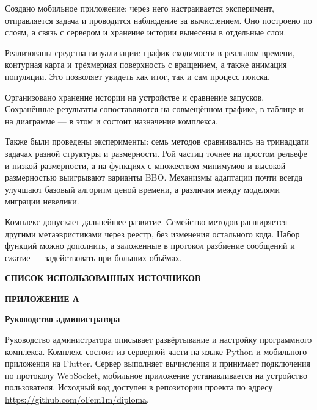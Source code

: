 \documentclass[14pt, a4paper]{extarticle}
\newcommand{\structelem}[1]{%
  \clearpage
  \phantomsection
  \addcontentsline{toc}{section}{#1}%
  \begin{center}\large\bfseries #1\end{center}
  \vspace{8pt}}
\begin{document}
Создано мобильное приложение: через него настраивается эксперимент, отправляется задача
и проводится наблюдение за вычислением. Оно построено по слоям, а связь с сервером и хранение
истории вынесены в отдельные слои.

Реализованы средства визуализации: график сходимости в реальном времени, контурная
карта и трёхмерная поверхность с вращением, а также анимация популяции. Это
позволяет увидеть как итог, так и сам процесс поиска.

Организовано хранение истории на устройстве и сравнение запусков. Сохранённые
результаты сопоставляются на совмещённом графике, в таблице и на диаграмме --- в
этом и состоит назначение комплекса.

Также были проведены эксперименты: семь методов сравнивались на тринадцати
задачах разной структуры и размерности. Рой частиц точнее на простом рельефе и
низкой размерности, а на функциях с множеством минимумов и высокой размерностью
выигрывают варианты BBO. Механизмы адаптации почти всегда улучшают базовый
алгоритм ценой времени, а различия между моделями миграции невелики.

Комплекс допускает дальнейшее развитие. Семейство методов расширяется другими метаэвристиками
через реестр, без изменения остального кода. Набор функций можно дополнить, а
заложенные в протокол разбиение сообщений и сжатие --- задействовать при больших
объёмах. 

\clearpage
{}
{}
\begin{center}\large\bfseries СПИСОК ИСПОЛЬЗОВАННЫХ ИСТОЧНИКОВ\end{center}
\vspace{8pt}
\printbibliography[heading=none]

\structelem{ПРИЛОЖЕНИЕ А}

\vspace{4pt}
\begin{center}\normalsize\bfseries Руководство администратора\end{center}
\vspace{8pt}

Руководство администратора описывает развёртывание и настройку программного
комплекса. Комплекс состоит из серверной части на языке Python и мобильного
приложения на Flutter. Сервер выполняет вычисления и принимает подключения по
протоколу WebSocket, мобильное приложение устанавливается на устройство
пользователя. Исходный код доступен в репозитории проекта по адресу
\url{https://github.com/oFem1m/diploma}.
\end{document}
